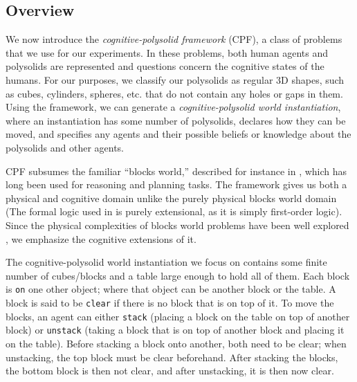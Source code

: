 \subsection{Overview}

We now introduce the \emph{cognitive-polysolid framework} (CPF), a
class of problems that we use for our experiments. In these problems,
both human agents and polysolids are represented and questions concern the
cognitive states of the humans. For our purposes,
we classify our polysolids as regular 3D shapes, such as cubes, cylinders, spheres, etc.
that do not contain any holes or gaps in them. Using
the framework, we can generate a \emph{cognitive-polysolid world
instantiation}, where an instantiation has some number of polysolids,
declares how they can be moved, and specifies any agents and their possible
beliefs or knowledge about the polysolids and other agents.

CPF subsumes the familiar ``blocks world,'' described for instance in
\cite{nilsson_principles_1982}, which has long been used for reasoning and
planning tasks.  The framework gives us both a physical and cognitive
domain unlike the purely physical blocks world domain (The formal
logic used in \cite{nilsson_principles_1982} is purely extensional, as it is
simply first-order logic).  Since the physical complexities of blocks
world problems have been well explored
\cite{gupta_complexity_1992,slaney_blocks_2001}, we emphasize the cognitive extensions
of it.

The cognitive-polysolid world instantiation we focus on contains some finite number
of cubes/blocks and a table large enough to hold all of them.  Each block is
\texttt{on} one other object; where that object can be another block or the
table.  A block is said to be \texttt{clear} if there is no block that
is on top of it.  To move the blocks, an agent can either
\texttt{stack} (placing a block on the table on top of another block)
or \texttt{unstack} (taking a block that is on top of another block
and placing it on the table).  Before stacking a block onto another, both need
to be clear; when unstacking, the top block must be clear beforehand.
After stacking the blocks, the bottom block is then not clear, and
after unstacking, it is then now clear.
